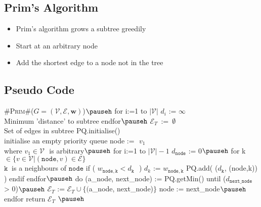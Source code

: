 \Outline %

\begin{slide}
\section[-2]{Prim's Algorithm}

\pausebuild
\color{TwoColor}
\begin{itemize}\squeeze
\item Prim's algorithm grows a subtree greedily\pauseh
\item Start at an arbitrary node\pauseh
\item Add the shortest edge to a node not in the tree
  \pause
\end{itemize}
  \vspace*{-1cm}
  \begin{center}\color{TextColor}
    \pause
  \end{center}
  \vspace*{-1cm}
\end{slide}



\begin{slide}
\section[-2.4]{Pseudo Code}

\begin{pseudo}
#\textsc{Prim}#($G=(\mathcal{V},\mathcal{E},\bm{w})$)$\pauseh$ {
   for i:=1 to $|\mathcal{V}|$
      $d_i$ := $\infty$               \\ Minimum 'distance' to subtree
   endfor$\pauseh$
   $\mathcal{E}_T\,$ := $\,\emptyset$                  \\ Set of edges in subtree
   PQ.initialise()       \\ initialise an empty priority queue
   node := $\,\,v_1$              \\ where $v_1\in\mathcal{V}\,\,$ is arbitrary$\pauseh$
   for i:=1 to $|\mathcal{V}|-1$
      $d_{\mathtt{node}}$ := 0$\pauseh$
      for k $\in \{v\in\mathcal{V}| (\mathtt{node},v)\in\mathcal{E}\}$ \\ $\mathtt{k}\ $ is a neighbours of $\mathtt{node}$
         if ( $w_{\mathtt{node,k}} < d_{\mathtt{k}}\,\,$  )
            $d_{k}$ := $w_{\mathtt{node,k}}$
            PQ.add( ($d_{\mathtt{k}}$, (node,k)) )
         endif
      endfor$\pauseh$
      do
         (a_node, next_node) := PQ.getMin()
      until ($d_{\mathtt{next\_node}}$  > 0)$\pauseh$
      $\mathcal{E}_T$ := $\mathcal{E}_T \cup \{($a_node, next_node)$\}$
      node := next_node$\pauseh$
   endfor
   return $\mathcal{E}_T$
}$\pauseh$
\end{pseudo}
\vspace*{-1cm}
\end{slide}

